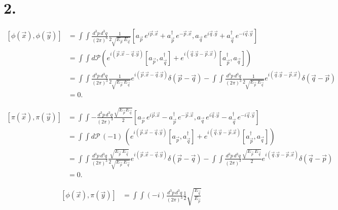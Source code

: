 \documentclass{article}
\newcommand{\onehalf}{\frac{1}{2}}
\newcommand{\pdotx}{\vec{p}.\vec{x}}
\newcommand{\qdoty}{\vec{q}.\vec{y}}
\newcommand{\asp}{a_{\vec{p}}}
\newcommand{\asq}{a_{\vec{q}}}
\begin{document}
\section*{2.}
\begin{equation}
    \begin{split}
        [\phi(\vec{x}), \phi(\vec{y})] &= \int\int \frac{d^3p\, d^3q}{(2\pi)^6}\frac{1}{2\sqrt{E_{\vec{p}}\, E_{\vec{q}}}}[
            \asp \, e^{i\pdotx} + \asp^\dagger \, e^{-\pdotx}, \asq \, e^{i\qdoty} + \asq^\dagger \, e^{-i\qdoty}] \\
        &= \int\int d\mathcal{P}\left(  e^{i (\pdotx - \qdoty)}[\asp, \asq^\dagger] + e^{i(\qdoty - \pdotx)}[\asp^\dagger,\asq]\right)\\
        &= \int\int \frac{d^3p \, d^3q}{(2\pi)^3}\frac{1}{2\sqrt{E_{\vec{p}}\, E_{\vec{q}}}}  e^{i (\pdotx - \qdoty)} \delta(\vec{p}-\vec{q}) - \int\int 
        \frac{d^3p \, d^3q}{(2\pi)^3} \frac{1}{2\sqrt{E_{\vec{p}}\, E_{\vec{q}}}} e^{i(\qdoty - \pdotx)} \delta(\vec{q}-\vec{p})\\
        &= 0.
    \end{split}
\end{equation}


\begin{equation}
    \begin{split}
        [\pi(\vec{x}), \pi(\vec{y})] &= \int\int - \frac{d^3p \, d^3q}{(2\pi)^3}\frac{\sqrt{E_{\vec{p}}E_{\vec{q}}}}{2}[
            \asp \, e^{i\pdotx} - \asp^\dagger \, e^{-\pdotx}, \asq \, e^{i\qdoty} - \asq^\dagger \, e^{-i\qdoty}] \\
        &= \int\int d\mathcal{P}\, (-1)\, \left( e^{i (\pdotx - \qdoty)}[\asp, \asq^\dagger] + e^{i(\qdoty - \pdotx)}[\asp^\dagger,\asq]  \right)\\
        &= \int\int \frac{d^3p \, d^3q}{(2\pi)^3}\frac{\sqrt{E_{\vec{p}}\, E_{\vec{q}}}}{2\sqrt{E_{\vec{p}}\, E_{\vec{q}}}}  e^{i (\pdotx - \qdoty)} \delta(\vec{p}-\vec{q}) - \int\int 
        \frac{d^3p \, d^3q}{(2\pi)^3} \frac{\sqrt{E_{\vec{p}}\, E_{\vec{q}}}}{2} e^{i(\qdoty - \pdotx)} \delta(\vec{q}-\vec{p})\\
        &=0.
    \end{split}
\end{equation}

\begin{equation}
    \begin{split}
        [\phi(\vec{x}), \pi(\vec{y})] &= \int\int (-i) \frac{d^3p \, d^3q}{(2\pi)^3}\onehalf\sqrt{\frac{E_{\vec{q}}}{E_{\vec{p}}}}
    \end{split}
\end{equation}
\end{document}
